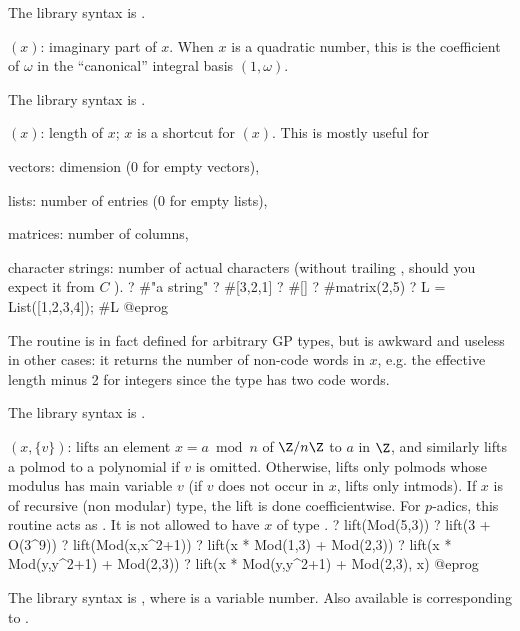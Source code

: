 The library syntax is .

$(x)$: \label{se:imag}imaginary part of $x$. When $x$ is a quadratic number, this is the
coefficient of $\omega$ in the ``canonical'' integral basis $(1,\omega)$.

The library syntax is .

$(x)$: \label{se:length}length of $x$; \kbd{\#}$x$ is a shortcut for $(x)$.
This is mostly useful for

\item vectors: dimension (0 for empty vectors),

\item lists: number of entries (0 for empty lists),

\item matrices: number of columns,

\item character strings: number of actual characters (without
trailing , should you expect it from $C$ ).
\bprog
 ? #"a string"
 ? #[3,2,1]
 ? #[]
 ? #matrix(2,5)
 ? L = List([1,2,3,4]); #L
@eprog

The routine is in fact defined for arbitrary GP types, but is awkward and
useless in other cases: it returns the number of non-code words in $x$, e.g.
the effective length minus 2 for integers since the  type has two code
words.

The library syntax is .

$(x,\{v\})$: \label{se:lift}lifts an element $x=a \bmod n$ of $\Z/n\Z$ to
$a$ in $\Z$, and similarly lifts a polmod to a polynomial if $v$ is omitted.
Otherwise, lifts only polmods whose modulus has main variable $v$ (if $v$
does not occur in $x$, lifts only intmods). If $x$ is of recursive (non
modular) type, the lift is done coefficientwise. For $p$-adics, this routine
acts as . It is not allowed to have $x$ of type .
\bprog
? lift(Mod(5,3))
? lift(3 + O(3^9))
? lift(Mod(x,x^2+1))
? lift(x * Mod(1,3) + Mod(2,3))
? lift(x * Mod(y,y^2+1) + Mod(2,3))
? lift(x * Mod(y,y^2+1) + Mod(2,3), x)
@eprog

The library syntax is , where  is a variable number.
Also available is  corresponding to
.

